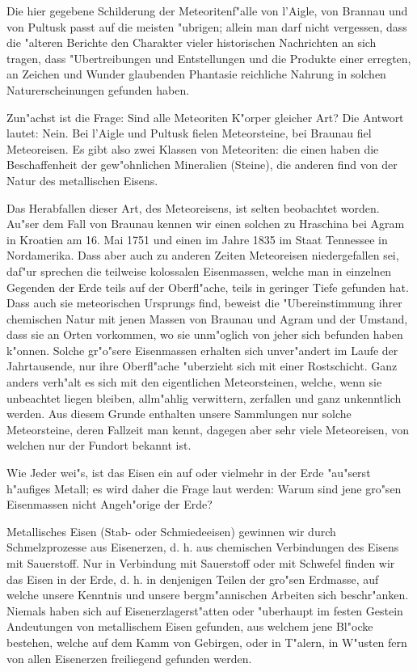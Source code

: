 \documentclass[a4paper, 11pt, oneside]{article}
\begin{document}
Die hier gegebene Schilderung der Meteoritenf"alle von l'Aigle, von Brannau und von Pultusk passt auf die meisten "ubrigen; allein man darf nicht vergessen, dass die "alteren Berichte den Charakter vieler historischen Nachrichten an sich tragen, dass "Ubertreibungen und Entstellungen und die Produkte einer erregten, an Zeichen und Wunder glaubenden Phantasie reichliche Nahrung in solchen Naturerscheinungen gefunden haben.

Zun"achst ist die Frage: Sind alle Meteoriten K"orper gleicher Art? Die Antwort lautet: Nein. Bei l'Aigle und Pultusk fielen Meteorsteine, bei Braunau fiel Meteoreisen. Es gibt also zwei Klassen von Meteoriten: die einen haben die Beschaffenheit der gew"ohnlichen Mineralien (Steine), die anderen find von der Natur des metallischen Eisens.

Das Herabfallen dieser Art, des Meteoreisens, ist selten beobachtet worden. Au"ser dem Fall von Braunau kennen wir einen solchen zu Hraschina bei Agram in Kroatien am 16. Mai 1751 und einen im Jahre 1835 im Staat Tennessee in Nordamerika. Dass aber auch zu anderen Zeiten Meteoreisen niedergefallen sei, daf"ur sprechen die teilweise kolossalen Eisenmassen, welche man in einzelnen Gegenden der Erde teils auf der Oberfl"ache, teils in geringer Tiefe gefunden hat. Dass auch sie meteorischen Ursprungs find, beweist die "Ubereinstimmung ihrer chemischen Natur mit jenen Massen von Braunau und Agram und der Umstand, dass sie an Orten vorkommen, wo sie unm"oglich von jeher sich befunden haben k"onnen. Solche gr"o"sere Eisenmassen erhalten sich unver"andert im Laufe der Jahrtausende, nur ihre Oberfl"ache "uberzieht sich mit einer Rostschicht. Ganz anders verh"alt es sich mit den eigentlichen Meteorsteinen, welche, wenn sie unbeachtet liegen bleiben, allm"ahlig verwittern, zerfallen und ganz unkenntlich werden. Aus diesem Grunde enthalten unsere Sammlungen nur solche Meteorsteine, deren Fallzeit man kennt, dagegen aber sehr viele Meteoreisen, von welchen nur der Fundort bekannt ist.

Wie Jeder wei"s, ist das Eisen ein auf oder vielmehr in der Erde "au"serst h"aufiges Metall; es wird daher die Frage laut werden: Warum sind jene gro"sen Eisenmassen nicht Angeh"orige der Erde?

Metallisches Eisen (Stab- oder Schmiedeeisen) gewinnen wir durch Schmelzprozesse aus Eisenerzen, d. h. aus chemischen Verbindungen des Eisens mit Sauerstoff. Nur in Verbindung mit Sauerstoff oder mit Schwefel finden wir das Eisen in der Erde, d. h. in denjenigen Teilen der gro"sen Erdmasse, auf welche unsere Kenntnis und unsere bergm"annischen Arbeiten sich beschr"anken. Niemals haben sich auf Eisenerzlagerst"atten oder "uberhaupt im festen Gestein Andeutungen von metallischem Eisen gefunden, aus welchem jene Bl"ocke bestehen, welche auf dem Kamm von Gebirgen, oder in T"alern, in W"usten fern von allen Eisenerzen freiliegend gefunden werden.
\end{document}
